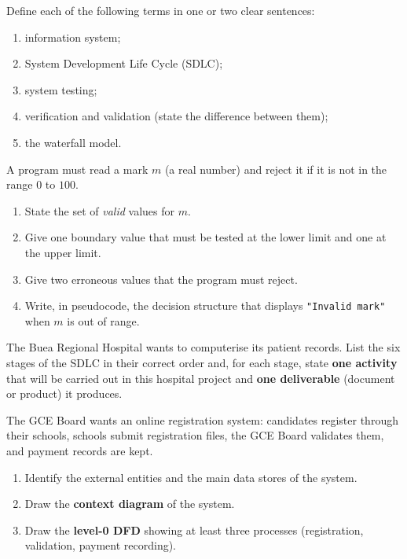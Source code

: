 \documentclass[11pt]{article}
\newcounter{popsec}
\newcounter{popsub}
\newcommand{\courssub}[1]{%
  \stepcounter{popsub}%
  \par\vspace{9pt}\noindent{\popxbold\fontsize{11.5}{13}\selectfont\color{popink}{\color{poporange}\thepopsec.\thepopsub}\hspace{6pt}#1}\par\nopagebreak\vspace{4pt}
}
\begin{document}
\begin{exercice}[Definitions]
Define each of the following terms in one or two clear sentences:
\begin{enumerate}
\item information system;
\item System Development Life Cycle (SDLC);
\item system testing;
\item verification and validation (state the difference between them);
\item the waterfall model.
\end{enumerate}
\end{exercice}

\begin{exercice}
A program must read a mark $m$ (a real number) and reject it if it is not in the range $0$ to $100$.
\begin{enumerate}
\item State the set of \emph{valid} values for $m$.
\item Give one boundary value that must be tested at the lower limit and one at the upper limit.
\item Give two erroneous values that the program must reject.
\item Write, in pseudocode, the decision structure that displays \texttt{"Invalid mark"} when $m$ is out of range.
\end{enumerate}
\end{exercice}

\courssub{I practise}

\begin{exercice}
The Buea Regional Hospital wants to computerise its patient records. List the six stages of the SDLC in their correct order and, for each stage, state \textbf{one activity} that will be carried out in this hospital project and \textbf{one deliverable} (document or product) it produces.
\end{exercice}

\begin{exercice}
The GCE Board wants an online registration system: candidates register through their schools, schools submit registration files, the GCE Board validates them, and payment records are kept.
\begin{enumerate}
\item Identify the external entities and the main data stores of the system.
\item Draw the \textbf{context diagram} of the system.
\item Draw the \textbf{level-0 DFD} showing at least three processes (registration, validation, payment recording).
\end{enumerate}
\end{exercice}
\end{document}
